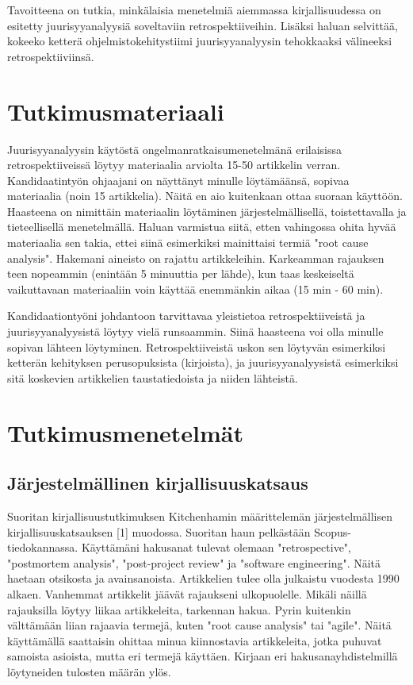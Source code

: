 \documentclass[12pt,a4paper,finnish,oneside]{article}
\begin{document}
Tavoitteena on tutkia, minkälaisia menetelmiä aiemmassa kirjallisuudessa on esitetty juurisyyanalyysiä soveltaviin retrospektiiveihin. Lisäksi haluan selvittää, kokeeko ketterä ohjelmistokehitystiimi juurisyyanalyysin tehokkaaksi välineeksi retrospektiiviinsä.

\section{Tutkimusmateriaali}

Juurisyyanalyysin käytöstä ongelmanratkaisumenetelmänä erilaisissa retrospektiiveissä löytyy materiaalia  arviolta 15-50 artikkelin verran. Kandidaatintyön ohjaajani on näyttänyt minulle löytämäänsä, sopivaa materiaalia (noin 15 artikkelia). Näitä en aio kuitenkaan ottaa suoraan käyttöön. Haasteena on nimittäin materiaalin löytäminen järjestelmällisellä, toistettavalla ja tieteellisellä menetelmällä. Haluan varmistua siitä, etten vahingossa ohita hyvää materiaalia sen takia, ettei siinä esimerkiksi mainittaisi termiä "root cause analysis".
Hakemani aineisto on rajattu artikkeleihin. Karkeamman rajauksen teen nopeammin (enintään 5 minuuttia per lähde), kun taas keskeiseltä vaikuttavaan materiaaliin voin käyttää enemmänkin aikaa (15 min - 60 min).

Kandidaationtyöni johdantoon tarvittavaa yleistietoa retrospektiiveistä ja juurisyyanalyysistä löytyy vielä runsaammin. Siinä haasteena voi olla minulle sopivan lähteen löytyminen. Retrospektiiveistä uskon sen löytyvän esimerkiksi ketterän kehityksen perusopuksista (kirjoista), ja juurisyyanalyysistä esimerkiksi sitä koskevien artikkelien taustatiedoista ja niiden lähteistä.

\section{Tutkimusmenetelmät}

\subsection{Järjestelmällinen kirjallisuuskatsaus}
Suoritan kirjallisuustutkimuksen Kitchenhamin määrittelemän järjestelmällisen kirjallisuuskatsauksen [1] muodossa. Suoritan haun pelkästään Scopus-tiedokannassa. Käyttämäni hakusanat tulevat olemaan "retrospective", "postmortem analysis", "post-project review" ja "software engineering". Näitä haetaan otsikosta ja avainsanoista. Artikkelien tulee olla julkaistu vuodesta 1990 alkaen. Vanhemmat artikkelit jäävät rajaukseni ulkopuolelle. Mikäli näillä rajauksilla löytyy liikaa artikkeleita, tarkennan hakua. Pyrin kuitenkin välttämään liian rajaavia termejä, kuten "root cause analysis" tai "agile". Näitä käyttämällä saattaisin ohittaa minua kiinnostavia artikkeleita, jotka puhuvat samoista asioista, mutta eri termejä käyttäen. Kirjaan eri hakusanayhdistelmillä löytyneiden tulosten määrän ylös.
\end{document}
